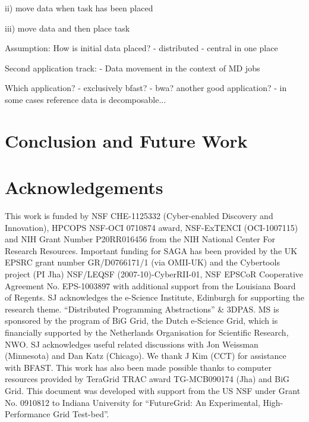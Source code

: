 \documentclass[conference]{IEEEtran}
\begin{document}
ii) move data when task has been placed

iii) move data and then place task

Assumption:
How is initial data placed?
- distributed
- central in one place

Second application track:
- Data movement in the context of MD jobs

Which application?
- exclusively bfast?
- bwa? another good application?
- in some cases reference data is decomposable...


\section{Conclusion and Future Work}

\section*{Acknowledgements}
\footnotesize \footnotesize{This work is funded by NSF CHE-1125332
  (Cyber-enabled Discovery and Innovation), HPCOPS NSF-OCI 0710874
  award, NSF-ExTENCI (OCI-1007115) and NIH Grant Number P20RR016456
  from the NIH National Center For Research Resources. Important
  funding for SAGA has been provided by the UK EPSRC grant number
  GR/D0766171/1 (via OMII-UK) and the Cybertools project (PI Jha)
  NSF/LEQSF (2007-10)-CyberRII-01, NSF EPSCoR Cooperative Agreement
  No. EPS-1003897 with additional support from the Louisiana Board of
  Regents.  SJ acknowledges the e-Science Institute, Edinburgh for
  supporting the research theme. ``Distributed Programming
  Abstractions'' \& 3DPAS. MS is sponsored by the program of BiG Grid,
  the Dutch e-Science Grid, which is financially supported by the
  Netherlands Organisation for Scientific Research, NWO. SJ
  acknowledges useful related discussions with Jon Weissman
  (Minnesota) and Dan Katz (Chicago). We thank J Kim (CCT) for
  assistance with BFAST.  This work has also been made possible thanks
  to computer resources provided by TeraGrid TRAC award TG-MCB090174
  (Jha) and BiG Grid.  This document was developed with support from
  the US NSF under Grant No. 0910812 to Indiana University for
  ``FutureGrid: An Experimental, High-Performance Grid Test-bed''.}

  


\end{document}
